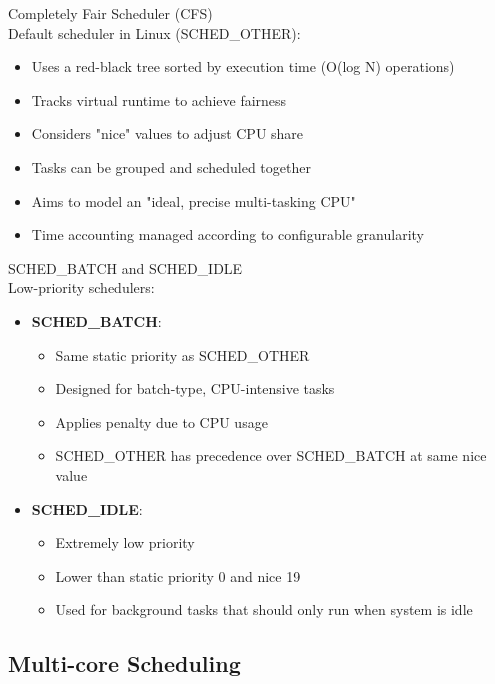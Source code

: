\begin{definition}{Completely Fair Scheduler (CFS)}\\
    Default scheduler in Linux (SCHED\_OTHER):
    \begin{itemize}
        \item Uses a red-black tree sorted by execution time (O(log N) operations)
        \item Tracks virtual runtime to achieve fairness
        \item Considers "nice" values to adjust CPU share
        \item Tasks can be grouped and scheduled together
        \item Aims to model an "ideal, precise multi-tasking CPU"
        \item Time accounting managed according to configurable granularity
    \end{itemize}
\end{definition}

\begin{definition}{SCHED\_BATCH and SCHED\_IDLE}\\
    Low-priority schedulers:
    \begin{itemize}
        \item \textbf{SCHED\_BATCH}:
            \begin{itemize}
                \item Same static priority as SCHED\_OTHER
                \item Designed for batch-type, CPU-intensive tasks
                \item Applies penalty due to CPU usage
                \item SCHED\_OTHER has precedence over SCHED\_BATCH at same nice value
            \end{itemize}
        \item \textbf{SCHED\_IDLE}:
            \begin{itemize}
                \item Extremely low priority
                \item Lower than static priority 0 and nice 19
                \item Used for background tasks that should only run when system is idle
            \end{itemize}
    \end{itemize}
\end{definition}

\subsection{Multi-core Scheduling}

